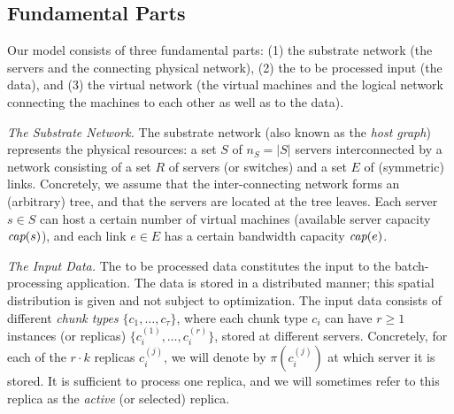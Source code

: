 \documentclass[9pt,twocolumn]{scrartcl}
\newcommand{\ChunkType}{\tau}
\newcommand{\achunk}{\ensuremath{c}}
\newcommand{\capacity}{\emph{cap}}
\begin{document}

\subsection{Fundamental Parts}

Our model consists of three fundamental parts: (1) the substrate network (the servers
and the connecting physical network),
(2) the to be processed input (the data), and
(3) the virtual network (the virtual machines and the logical network connecting the machines to each other
as well as to the data).

\emph{The Substrate Network.} The substrate network (also known as the \emph{host graph}) represents the physical resources:
a set $S$ of $n_S=|S|$ servers interconnected by a network consisting of a set $R$ of servers (or switches)
and a set $E$ of (symmetric) links. Concretely, we assume that the inter-connecting network forms an (arbitrary) tree,
and that the servers are located at the tree leaves.
Each server $s\in S$ can host a certain number
of virtual machines (available server capacity $\capacity(s)$), and each link $e\in E$ has a certain bandwidth
capacity $\capacity(e)$.

\emph{The Input Data.} The to be processed data constitutes the input to the batch-processing application.
The data is stored in a distributed manner; this spatial distribution is given and not subject to optimization.
The input data consists of different \emph{chunk types} $\{\achunk_1, \ldots, \achunk_{\ChunkType}\}$,
where each chunk type $\achunk_i$ can have $r\geq 1$ instances (or replicas) $\{\achunk_{i}^{(1)},\ldots, \achunk_{i}^{(r)}\}$,
 stored at different servers.
Concretely, for each of the $r\cdot k$ replicas $\achunk_{i}^{(j)}$, we will denote by $\pi(\achunk_{i}^{(j)})$ at
which server it is stored. It is sufficient to process one replica, and we will sometimes refer to this
replica as the \emph{active} (or selected) replica.
\end{document}
